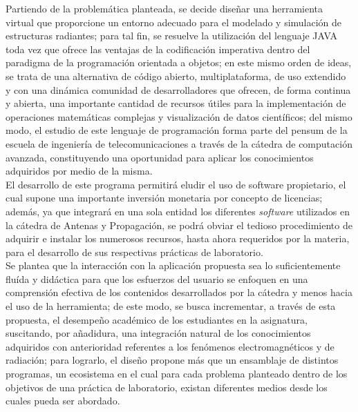 Partiendo de la problemática planteada, se decide diseñar una herramienta virtual que proporcione un entorno adecuado para el modelado y simulación de estructuras radiantes; para tal fin, se resuelve la utilización del lenguaje JAVA toda vez que ofrece las ventajas de la codificación imperativa dentro del paradigma de la programación orientada a objetos; en este mismo orden de ideas, se trata de una alternativa de código abierto, multiplataforma, de uso extendido y con una dinámica comunidad de desarrolladores que ofrecen, de forma continua y abierta, una importante cantidad de recursos útiles para la implementación de operaciones matemáticas complejas y visualización de datos científicos; del mismo modo, el estudio de este lenguaje de programación forma parte del pensum de la escuela de ingeniería de telecomunicaciones a través de la cátedra de computación avanzada, constituyendo una oportunidad para aplicar los conocimientos adquiridos por medio de la misma.\\
El desarrollo de este programa permitirá eludir el uso de software propietario, el cual supone una importante inversión monetaria por concepto de licencias; además, ya que integrará en una sola entidad los diferentes \textit{software} utilizados en la cátedra de Antenas y Propagación, se podrá obviar el tedioso procedimiento de adquirir e instalar los numerosos recursos, hasta ahora requeridos por la materia, para el desarrollo de sus respectivas prácticas de laboratorio.\\
Se plantea que la interacción con la aplicación propuesta sea lo suficientemente fluída y didáctica para que los esfuerzos del usuario se enfoquen en una comprensión efectiva de los contenidos desarrollados por la cátedra y menos hacia el uso de la herramienta; de este modo, se busca incrementar, a través de esta propuesta, el desempeño académico de los estudiantes en la asignatura, suscitando, por añadidura, una integración natural de los conocimientos adquiridos con anterioridad referentes a los fenómenos electromagnéticos y de radiación; para lograrlo, el diseño propone más que un ensamblaje de distintos programas, un ecosistema en el cual para cada problema planteado dentro de los objetivos de una práctica de laboratorio, existan diferentes medios desde los cuales pueda ser abordado.\\


